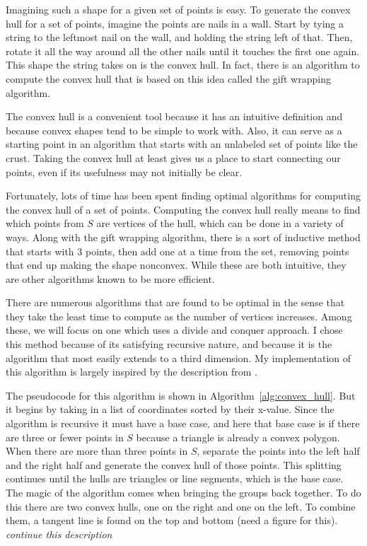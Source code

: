 Imagining such a shape for a given set of points is easy.
To generate the convex hull for a set of points, imagine the points are nails in a wall.
Start by tying a string to the leftmost nail on the wall, and holding the string left of that.
Then, rotate it all the way around all the other nails until it touches the first one again.
This shape the string takes on is the convex hull.
In fact, there is an algorithm to compute the convex hull that is based on this idea called the gift wrapping algorithm.



The convex hull is a convenient tool because it has an intuitive definition and because convex shapes tend to be simple to work with.
Also, it can serve as a starting point in an algorithm that starts with an unlabeled set of points like the crust.
Taking the convex hull at least gives us a place to start connecting our points, even if its usefulness may not initially be clear.

Fortunately, lots of time has been spent finding optimal algorithms for computing the convex hull of a set of points.
Computing the convex hull really means to find which points from $S$ are vertices of the hull, which can be done in a variety of ways.
Along with the gift wrapping algorithm, there is a sort of inductive method that starts with 3 points, then add one at a time from the set, removing points that end up making the shape nonconvex.
While these are both intuitive, they are other algorithms known to be more efficient.

There are numerous algorithms that are found to be optimal in the sense that they take the least time to compute as the number of vertices increases.
Among these, we will focus on one which uses a divide and conquer approach.
I chose this method because of its satisfying recursive nature, and because it is the algorithm that most easily extends to a third dimension.
My implementation of this algorithm is largely inspired by the description from \citet{textbook}.

The pseudocode for this algorithm is shown in Algorithm~\ref{alg:convex_hull}. But it begins by taking in a list of coordinates sorted by their x-value.
Since the algorithm is recursive it must have a base case, and here that base case is if there are three or fewer points in $S$ because a triangle is already a convex polygon.
When there are more than three points in $S$, separate the points into the left half and the right half and generate the convex hull of those points.
This splitting continues until the hulls are triangles or line segments, which is the base case.
The magic of the algorithm comes when bringing the groups back together.
To do this there are two convex hulls, one on the right and one on the left.
To combine them, a tangent line is found on the top and bottom (need a figure for this).
\textit{continue this description}

